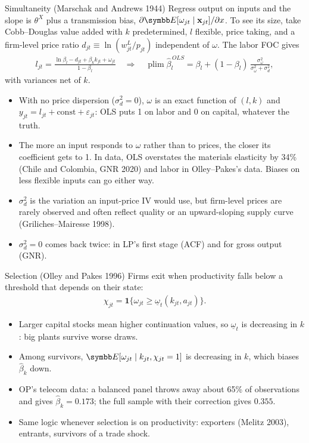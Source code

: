 \documentclass[aspectratio=169,10pt]{beamer}
\begin{document}
\begin{frame}{Simultaneity (Marschak and Andrews 1944)}
\small
Regress output on inputs and the slope is $\theta^X$ plus a \alert{transmission bias}, $\partial \E[\omega_{jt} \mid \mathbf{x}_{jt}]/\partial x$. To see its size, take Cobb--Douglas value added with $k$ predetermined, $l$ flexible, price taking, and a firm-level price ratio $d_{jt} \equiv \ln(w^L_{jt}/p_{jt})$ independent of $\omega$. The labor FOC gives
\begin{align*}
l_{jt} = \frac{\ln\beta_l - d_{jt} + \beta_k k_{jt} + \omega_{jt}}{1 - \beta_l}
\quad\Longrightarrow\quad
\operatorname{plim} \hat\beta_l^{\,OLS} = \beta_l + (1 - \beta_l)\, \frac{\sigma^2_\omega}{\sigma^2_\omega + \sigma^2_d},
\end{align*}
with variances net of $k$.
\begin{itemize}
\item With no price dispersion ($\sigma^2_d = 0$), $\omega$ is an exact function of $(l, k)$ and $y_{jt} = l_{jt} + \text{const} + \varepsilon_{jt}$: OLS puts 1 on labor and 0 on capital, whatever the truth.
\item The more an input responds to $\omega$ rather than to prices, the closer its coefficient gets to 1. In data, OLS overstates the materials elasticity by 34\% (Chile and Colombia, GNR 2020) and labor in Olley--Pakes's data. Biases on less flexible inputs can go either way.
\item $\sigma^2_d$ is the variation an input-price IV would use, but firm-level prices are rarely observed and often reflect quality or an upward-sloping supply curve (Griliches--Mairesse 1998).
\item $\sigma^2_d = 0$ comes back twice: in LP's first stage (ACF) and for gross output (GNR).
\end{itemize}
\end{frame}


\begin{frame}{Selection (Olley and Pakes 1996)}
Firms exit when productivity falls below a threshold that depends on their state:
\begin{align*}
\chi_{jt} = \mathbf{1}\{\omega_{jt} \ge \underline{\omega}_t(k_{jt}, a_{jt})\}.
\end{align*}
\begin{itemize}
\item Larger capital stocks mean higher continuation values, so $\underline{\omega}_t$ is \alert{decreasing} in $k$: big plants survive worse draws.
\item Among survivors, $\E[\omega_{jt} \mid k_{jt}, \chi_{jt} = 1]$ is decreasing in $k$, which biases $\hat\beta_k$ \alert{down}.
\item OP's telecom data: a balanced panel throws away about 65\% of observations and gives $\hat\beta_k = 0.173$; the full sample with their correction gives $0.355$.
\item Same logic whenever selection is on productivity: exporters (Melitz 2003), entrants, survivors of a trade shock.
\end{itemize}
\end{frame}
\end{document}

